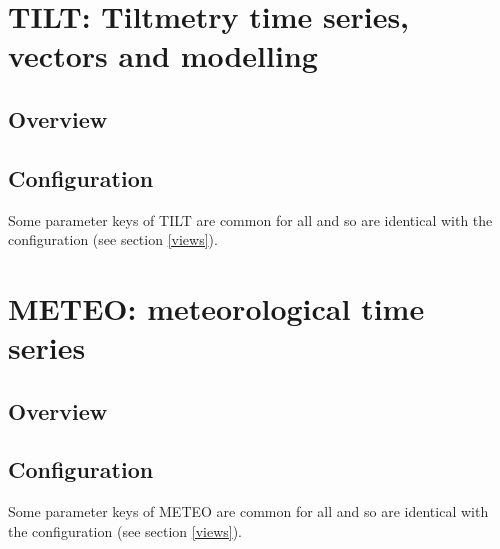 


\section{TILT: Tiltmetry time series, vectors and modelling}

\subsection{Overview}

\subsection{Configuration}

Some parameter keys of TILT are common for all  and  so are identical with the  configuration (see section \ref{views}).




\section{METEO: meteorological time series}

\subsection{Overview}

\subsection{Configuration}

Some parameter keys of METEO are common for all  and  so are identical with the  configuration (see section \ref{views}).




